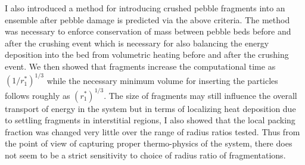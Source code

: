 I also introduced a method for introducing crushed pebble fragments into an ensemble after pebble damage is predicted via the above criteria. The method was necessary to enforce conservation of mass between pebble beds before and after the crushing event which is necessary for also balancing the energy deposition into the bed from volumetric heating before and after the crushing event. We then showed that fragments increase the computational time as $(1/r_1^*)^{1/3}$ while the necessary minimum volume for inserting the particles follows roughly as $(r_1^*)^{1/3}$. The size of fragments may still influence the overall transport of energy in the system but in terms of localizing heat deposition due to settling fragments in interstitial regions, I also showed that the local packing fraction was changed very little over the range of radius ratios tested. Thus from the point of view of capturing proper thermo-physics of the system, there does not seem to be a strict sensitivity to choice of radius ratio of fragmentations.


 